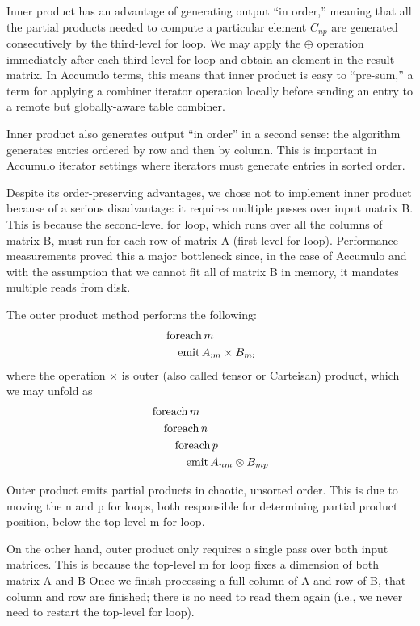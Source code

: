 Inner product has an advantage of generating output ``in order,'' meaning that all the partial products needed 
to compute a particular element $C_{np}$ are generated consecutively by the third-level for loop.
We may apply the $\oplus$ operation immediately after each third-level for loop and obtain an element in the result matrix.
In Accumulo terms, this means that inner product is easy to ``pre-sum,'' a term for applying a combiner iterator operation
locally before sending an entry to a remote but globally-aware table combiner.

Inner product also generates output ``in order'' in a second sense: the algorithm generates entries ordered by row 
and then by column.  This is important in Accumulo iterator settings where iterators must generate entries in sorted order.

Despite its order-preserving advantages, we chose not to implement inner product because of a serious disadvantage:
it requires multiple passes over input matrix B. This is because the second-level for loop, which runs over all the columns of
matrix B, must run for each row of matrix A (first-level for loop).
Performance measurements proved this a major bottleneck since, in the case of Accumulo
and with the assumption that we cannot fit all of matrix B in memory, it mandates multiple reads from disk.

The outer product method performs the following:
\begin{align*}
&\fore m \\
&\quad\emit A_{:m} \times B_{m:} 
\end{align*}
where the operation $\times$ is outer (also called tensor or Carteisan) product, which we may unfold as
\begin{align*}
&\operatorname{foreach} m \\
&\quad\operatorname{foreach} n \\
&\quad\quad\operatorname{foreach} p \\
&\quad\quad\quad\operatorname{emit} A_{nm} \otimes B_{mp} 
\end{align*}

Outer product emits partial products in chaotic, unsorted order.
This is due to moving the n and p for loops, both responsible for determining partial product position,
below the top-level m for loop.

On the other hand, outer product only requires a single pass over both input matrices.
This is because the top-level m for loop fixes a dimension of both matrix A and B 
Once we finish processing a full column of A and row of B, that column and row are finished;
there is no need to read them again (i.e., we never need to restart the top-level for loop).

